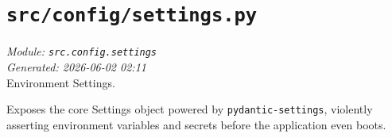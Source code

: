 
\section{\texttt{src/config/settings.py}}
\textit{Module: \texttt{src.config.settings}} \\
\textit{Generated: 2026-06-02 02:11} \\

Environment Settings.

Exposes the core Settings object powered by \texttt{pydantic-settings},
violently asserting environment variables and secrets before the
application even boots.
